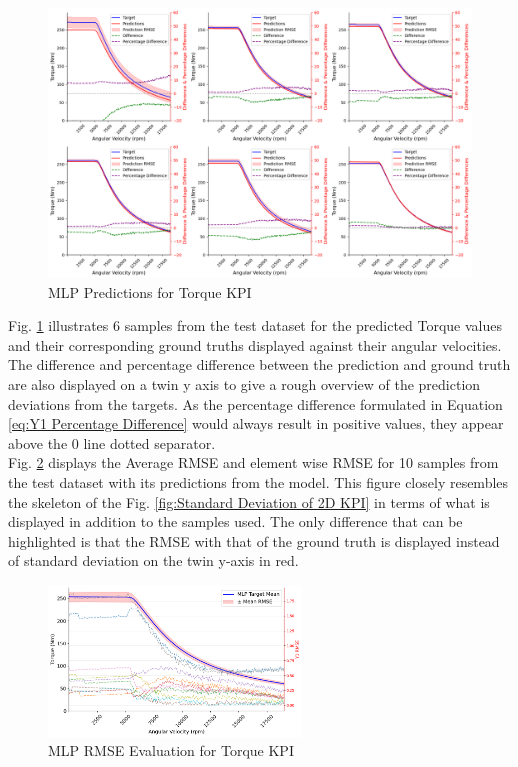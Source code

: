 \documentclass{report} %
\begin{document}
\begin{figure}[H]
    \centering
    \includegraphics[width=.9\textwidth]{./ReportImages/KPI2D_predictions.png} 
    \caption{MLP Predictions for Torque \ac{KPI}} 
    \label{fig:MLP Training Results for 2D KPI(Torque)}
\end{figure}

Fig. \ref{fig:MLP Training Results for 2D KPI(Torque)} illustrates 6 samples from the test dataset for the predicted Torque values and their corresponding ground truths 
displayed against their angular velocities. The difference and percentage difference between the prediction and ground truth are also displayed on a twin y axis to 
give a rough overview of the prediction deviations from the targets. As the percentage difference formulated in Equation \ref{eq:Y1 Percentage Difference} would 
always result in positive values, they appear above the 0 line dotted separator.\\

Fig. \ref{fig:MLP RMSE Evaluation for 2D KPI(Torque)} displays the Average \ac{RMSE} and element wise \ac{RMSE} for 10 samples from the test dataset with its predictions 
from the model. 
This figure closely resembles the skeleton of the Fig. \ref{fig:Standard Deviation of 2D KPI} in terms of what is displayed in addition to the samples used. 
The only difference that can be highlighted is that the \ac{RMSE} with that of the ground truth is displayed instead of standard deviation on the twin y-axis in red.

\begin{figure}[H]
    \centering
    \includegraphics[width=0.6\textwidth]{./ReportImages/RMSE_MLP_y1.png} 
    \caption{\ac{MLP} \ac{RMSE} Evaluation for Torque \ac{KPI}} 
    \label{fig:MLP RMSE Evaluation for 2D KPI(Torque)}
\end{figure}
\end{document}
